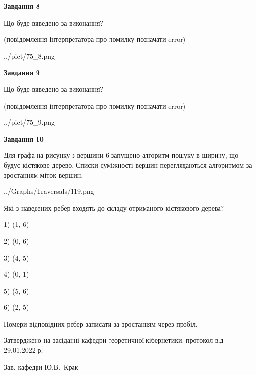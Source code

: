 \documentclass[12pt, ukrainian]{article}
\begin{document}
{\begin {large}
{\begin {center}\textbf{Завдання 8}\end {center}}\par
Що буде виведено за виконання?\par
 (повідомлення інтерпретатора про помилку позначати error)\par
\begin{center}
	{../pict/75_8.png}
\end{center}
\newpage

{\begin {center}\textbf{Завдання 9}\end {center}}\par
Що буде виведено за виконання?\par
 (повідомлення інтерпретатора про помилку позначати error)\par
\begin{center}
	{../pict/75_9.png}
\end{center}
\newpage

{\begin {center}\textbf{Завдання 10}\end {center}}\par
Для графа на рисунку з вершини 6 запущено алгоритм пошуку в ширину, що будує кістякове дерево. Списки суміжності вершин переглядаються алгоритмом за зростанням міток вершин.\par
\begin{center}
	{../Graphs/Traversals/119.png}
\end{center}
\par Які з наведених ребер входять до складу отриманого кістякового дерева?\par
1) (1, 6)\par
2) (0, 6)\par
3) (4, 5)\par
4) (0, 1)\par
5) (5, 6)\par
6) (2, 5)\par
{\vskip 15pt} Номери відповідних ребер записати за зростанням через пробіл.\par
\newpage


\end {large}
}
{\smallskip \begin {small} Затверджено на засіданні кафедри теоретичної кібернетики, протокол  від   29.01.2022 р.\par\smallskip\smallskip
{\parbox {6.5 cm}{Зав. кафедри \dotfill Ю.В.~Крак}} \end{small}}
\end{document}

